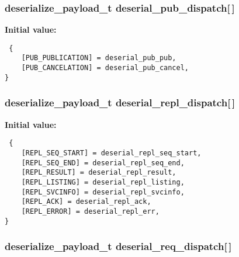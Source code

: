 \subsubsection{\setlength{\rightskip}{0pt plus 5cm}\bf{deserialize\_\-payload\_\-t} \bf{deserial\_\-pub\_\-dispatch}[$\,$]\hspace{0.3cm}{\tt  [static]}}\label{upk__v0__protocol__serializer_8c_f7d67b30b363f5c6e6cafcb93fc70098}


\textbf{Initial value:}

\begin{Code}\begin{verbatim} {
    [PUB_PUBLICATION] = deserial_pub_pub,
    [PUB_CANCELATION] = deserial_pub_cancel,
}
\end{verbatim}\end{Code}
\subsubsection{\setlength{\rightskip}{0pt plus 5cm}\bf{deserialize\_\-payload\_\-t} \bf{deserial\_\-repl\_\-dispatch}[$\,$]\hspace{0.3cm}{\tt  [static]}}\label{upk__v0__protocol__serializer_8c_89003ae668a43676eec307e8935b1e7d}


\textbf{Initial value:}

\begin{Code}\begin{verbatim} {
    [REPL_SEQ_START] = deserial_repl_seq_start,
    [REPL_SEQ_END] = deserial_repl_seq_end,
    [REPL_RESULT] = deserial_repl_result,
    [REPL_LISTING] = deserial_repl_listing,
    [REPL_SVCINFO] = deserial_repl_svcinfo,
    [REPL_ACK] = deserial_repl_ack,
    [REPL_ERROR] = deserial_repl_err,
}
\end{verbatim}\end{Code}
\subsubsection{\setlength{\rightskip}{0pt plus 5cm}\bf{deserialize\_\-payload\_\-t} \bf{deserial\_\-req\_\-dispatch}[$\,$]\hspace{0.3cm}{\tt  [static]}}\label{upk__v0__protocol__serializer_8c_6799c8eca227a8f0f1c2ac133b1a6d8f}


